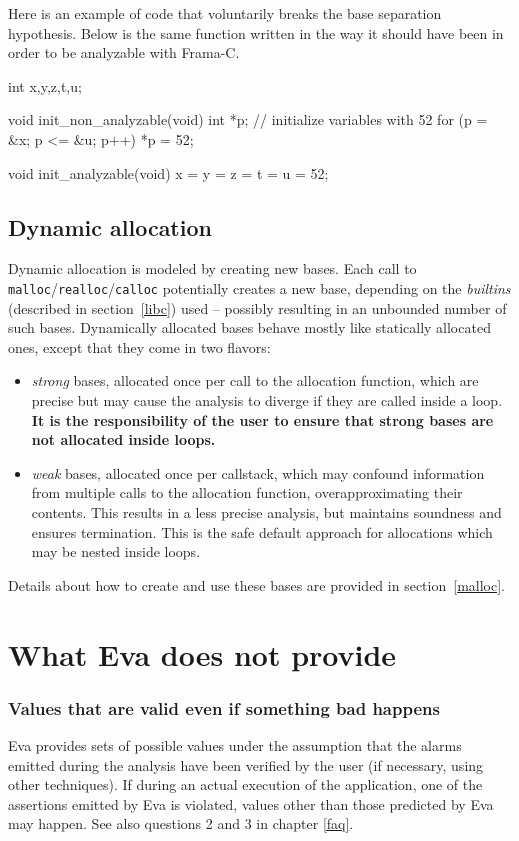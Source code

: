 \documentclass[web]{frama-c-book}
\newcommand{\Eva}{\textsf{Eva}}
\begin{document}
Here is an example of code that voluntarily breaks the base separation
hypothesis. Below is the same function written in the way it should
have been in order to be analyzable with Frama-C.
\begin{listing}{1}
int x,y,z,t,u;

void init_non_analyzable(void)
{
  int *p;
  // initialize variables with 52
  for (p = &x; p <= &u; p++)
    *p = 52;
}

void init_analyzable(void)
{
  x = y = z = t = u = 52;
}
\end{listing}

\subsection{Dynamic allocation}
\label{dyn-alloc}

Dynamic allocation is modeled by creating new bases.
Each call to \lstinline|malloc|/\lstinline|realloc|/\lstinline|calloc|
potentially creates a
new base, depending on the \emph{builtins} (described in section~\ref{libc})
used -- possibly resulting in an unbounded number of such bases.
Dynamically allocated bases behave mostly like statically allocated ones,
except that they come in two flavors:
%
\begin{itemize}
\item \emph{strong} bases, allocated once per call to the allocation function,
  which are precise but may cause the analysis to diverge if they are called
  inside a loop. \textbf{It is the responsibility of the user to ensure that
  strong bases are not allocated inside loops.}
\item \emph{weak} bases, allocated once per callstack, which may confound
  information from multiple calls to the allocation function, overapproximating
  their contents. This results in a less precise analysis,
  but maintains soundness and ensures termination.
  This is the safe default approach for allocations which may be nested inside
  loops.
\end{itemize}

Details about how to create and use these bases are provided in
section~\ref{malloc}.

\section{What \Eva{} does not provide}

\subsubsection{Values that are valid even if something bad happens}
\Eva{} provides sets of possible values under the
assumption that the alarms emitted during the analysis have been
verified by the user (if necessary, using other techniques). 
If during an actual execution of the application, 
one of the assertions emitted by \Eva{} is violated,
values other than those predicted by \Eva{} may happen.
See also questions 2 and 3 in chapter \ref{faq}.
\end{document}
